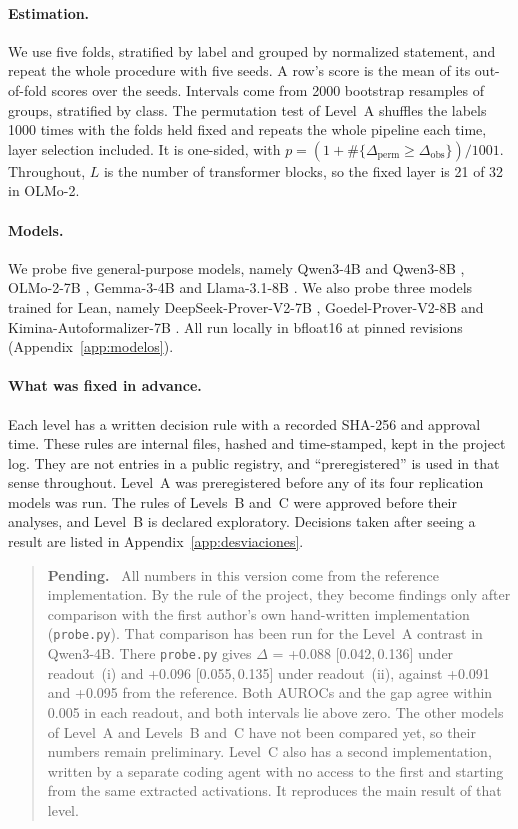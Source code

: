 \documentclass[10pt]{article}
\newcommand{\vr}[1]{\texttt{#1}}
\newcommand{\D}{\Delta}
\newcommand{\ic}[2]{[#1,\,#2]}
\newenvironment{pendiente}{\begin{quote}\small\noindent\textbf{Pending.}\ }{\end{quote}}
\begin{document}
\paragraph{Estimation.}
We use five folds, stratified by label and grouped by normalized statement, and repeat the whole procedure with
five seeds. A row's score is the mean of its out-of-fold scores over the seeds. Intervals come from 2000 bootstrap
resamples of groups, stratified by class. The permutation test of Level~A shuffles the labels 1000 times with the
folds held fixed and repeats the whole pipeline each time, layer selection included. It is one-sided, with
$p = (1 + \#\{\D_{\mathrm{perm}} \ge \D_{\mathrm{obs}}\})/1001$. Throughout, $L$ is the number of transformer
blocks, so the fixed layer is 21 of 32 in OLMo-2.

\paragraph{Models.}
We probe five general-purpose models, namely Qwen3-4B and Qwen3-8B \citep{qwen3}, OLMo-2-7B \citep{olmo2},
Gemma-3-4B \citep{gemma3} and Llama-3.1-8B \citep{llama3}. We also probe three models trained for Lean, namely
DeepSeek-Prover-V2-7B \citep{deepseekproverv2}, Goedel-Prover-V2-8B \citep{goedelproverv2} and
Kimina-Autoformalizer-7B \citep{kimina,kiminaautoformalizer}. All run locally in bfloat16 at pinned
revisions (Appendix~\ref{app:modelos}).

\paragraph{What was fixed in advance.}
Each level has a written decision rule with a recorded SHA-256 and approval time. These rules are internal files,
hashed and time-stamped, kept in the project log. They are not entries in a public registry, and ``preregistered''
is used in that sense throughout. Level~A was preregistered before any of its four replication models was run. The
rules of Levels~B and~C were approved before their analyses, and Level~B is declared exploratory. Decisions taken
after seeing a result are listed in Appendix~\ref{app:desviaciones}.

\begin{pendiente}
All numbers in this version come from the reference implementation. By the rule of the project,
they become findings only after comparison with the first author's own hand-written implementation
(\vr{probe.py}). That comparison has been run for the Level~A contrast in Qwen3-4B. There \vr{probe.py} gives
$\D$ = +0.088 \ic{0.042}{0.136} under readout~(i) and +0.096 \ic{0.055}{0.135} under readout~(ii), against +0.091
and +0.095 from the reference. Both AUROCs and the gap agree within 0.005 in each readout, and both intervals lie
above zero. The other models of Level~A and Levels~B and~C have not been compared yet, so their numbers remain
preliminary. Level~C also has a second implementation, written by a separate coding
agent with no access to the first and starting from the same extracted activations. It reproduces the main result
of that level.
\end{pendiente}
\end{document}
